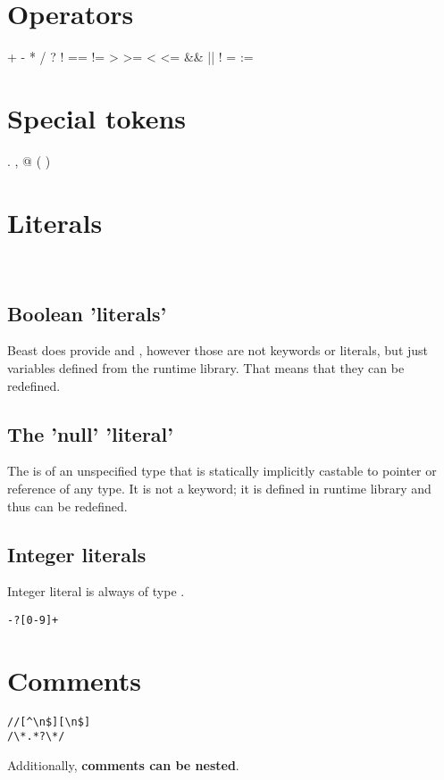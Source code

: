 \section{Operators}
\begin{code}
+ - * / ? ! == != > >= < <= && || ! = :=
\end{code}

\section{Special tokens}
\begin{code}
. , @ ( ) { }
\end{code}

\section{Literals}
\begin{grammar}
	  \\
\end{grammar}

\subsection{Boolean 'literals'}
Beast does provide  and , however those are not keywords or literals, but just  variables defined from the runtime library. That means that they can be redefined.

\subsection{The 'null' 'literal'}
The  is of an unspecified type that is statically implicitly castable to pointer or reference of any type. It is not a keyword; it is defined in runtime library and thus can be redefined.

\subsection{Integer literals}
Integer literal is always of type .

\begin{grammar}
	 \verb|-?[0-9]+| 
\end{grammar}

\section{Comments}
\begin{grammar}
	 \verb|//[^\n$][\n$]| \\
	 \verb|/\*.*?\*/|
\end{grammar}
Additionally, \textbf{comments can be nested}.


